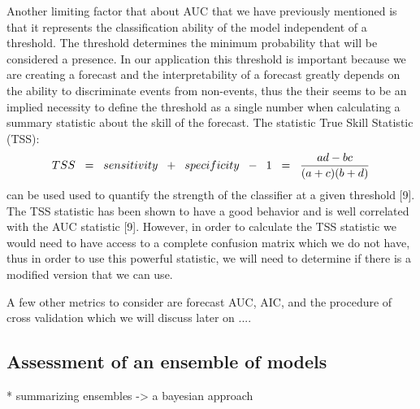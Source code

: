 \noindent Another limiting factor that about AUC that we have previously mentioned is that it represents the classification ability of the model independent of a threshold. The threshold determines the minimum probability that will be considered a presence. In our application this threshold is important because we are creating a forecast and the interpretability of a forecast greatly depends on the ability to discriminate events from non-events, thus the their seems to be an implied necessity to define the threshold as a single number when calculating a summary statistic about the skill of the forecast. The statistic True Skill Statistic (TSS):
\begin{equation}
TSS \hspace{0.2cm} = \hspace{0.2cm} sensitivity \hspace{0.2cm} + \hspace{0.2cm} specificity\hspace{0.2cm}  -\hspace{0.2cm} 1 \hspace{0.2cm} =  \hspace{0.2cm} \frac{ad -bc}{(a+c)(b+d)}
\end{equation}
can be used used to quantify the strength of the classifier at a given threshold [9]. The TSS statistic has been shown to have a good behavior and is well correlated with the AUC statistic [9]. However, in order to calculate the TSS statistic we would need to have access to a complete confusion matrix which we do not have, thus in order to use this powerful statistic, we will need to determine if there is a modified version that we can use. \newline

\noindent A few other metrics to consider are forecast AUC, AIC, and the procedure of cross validation which we will discuss later on ....\newline

\subsection{Assessment of an ensemble of models}
* summarizing ensembles -> a bayesian approach \newline




